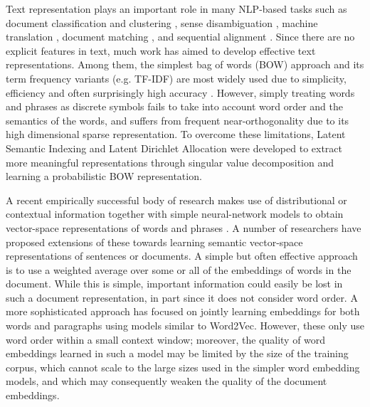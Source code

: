 \documentclass[11pt,a4paper]{article}
\newcommand{\1}{\boldsymbol{1}}
\begin{document}
Text representation plays an important role in many NLP-based tasks such as document classification and clustering \cite{zhang2018sentence,gui2016representative,gui2014estimate}, sense disambiguation \cite{gong2017prepositions,gong2018embedding}, machine translation \cite{mikolov2013exploiting}, document matching \cite{pham2015learning}, and sequential alignment \cite{peng2016recurrent,peng2015piefa}. Since there are no explicit features in text, much work has aimed to develop effective text representations. Among them, the simplest bag of words (BOW) approach \cite{salton1988term} and its term frequency variants (e.g. TF-IDF) \cite{robertson1994some} are most widely used due to simplicity, efficiency and often surprisingly high accuracy \cite{wang2012baselines}. However, simply treating words and phrases as discrete symbols fails to take into account word order and the semantics of the words, and suffers from frequent near-orthogonality due to its high dimensional sparse representation. To overcome these limitations, Latent Semantic Indexing  \cite{deerwester1990indexing} and Latent Dirichlet Allocation \cite{blei2003latent} were developed to extract more meaningful representations through singular value decomposition \cite{wu2015preconditioned} and learning a probabilistic BOW representation. 

A recent empirically successful body of research makes use of distributional or contextual information together with simple neural-network models to obtain vector-space representations of words and phrases \cite{bengio2003neural,mikolov2013efficient,mikolov2013distributed,pennington2014glove}. A number of researchers have proposed extensions of these towards learning semantic vector-space representations of sentences or documents. A simple but often effective approach is to use a weighted average over some or all of the embeddings of words in the document. While this is simple, important information could easily be lost in such a document representation, in part since it does not consider word order. A more sophisticated approach \cite{le2014distributed,Chen2017efficient} has focused on jointly learning embeddings for both words and paragraphs using  models similar to Word2Vec. However, these only use word order within a small context window; moreover, the quality of word embeddings learned in such a model may be limited by the size of the training corpus, which cannot scale to the large sizes used in the simpler word embedding models, and which may consequently weaken the quality of the document embeddings. 
\end{document}
